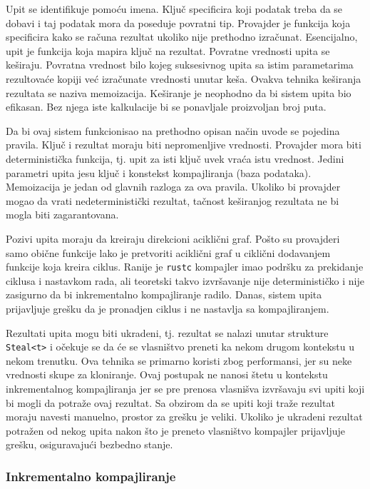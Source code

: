 Upit se identifikuje pomoću imena. Ključ specificira koji podatak treba da se dobavi i taj podatak 
mora da poseduje povratni tip. Provajder je funkcija koja specificira kako se računa rezultat ukoliko nije 
prethodno izračunat. Esencijalno, upit je funkcija koja mapira ključ na rezultat. 
Povratne vrednosti upita se keširaju. Povratna vrednost bilo kojeg suksesivnog upita sa istim parametarima rezultovaće 
kopiji već izračunate vrednosti unutar keša. Ovakva tehnika keširanja rezultata se naziva memoizacija.
Keširanje je neophodno da bi sistem upita bio efikasan. Bez njega iste kalkulacije bi se ponavljale proizvoljan broj puta.

Da bi ovaj sistem funkcionisao na prethodno opisan način uvode se pojedina pravila. Ključ i rezultat 
moraju biti nepromenljive vrednosti. Provajder mora biti deterministička funkcija, tj. upit za isti ključ
uvek vraća istu vrednost. Jedini parametri upita jesu ključ i konstekst kompajliranja (baza podataka).
Memoizacija je jedan od glavnih razloga za ova pravila. Ukoliko bi provajder mogao da vrati nedeterministički rezultat,
tačnost keširanjog rezultata ne bi mogla biti zagarantovana.

Pozivi upita moraju da kreiraju direkcioni aciklični graf. Pošto su provajderi samo obične funkcije lako je pretvoriti 
aciklični graf u ciklični dodavanjem funkcije koja kreira ciklus. Ranije je \verb|rustc| kompajler imao podršku 
za prekidanje ciklusa i nastavkom rada, ali teoretski takvo izvršavanje nije determinističko i nije zasigurno da bi 
inkrementalno kompajliranje radilo. Danas, sistem upita prijavljuje grešku da je pronadjen ciklus
i ne nastavlja sa kompajliranjem.

Rezultati upita mogu biti ukradeni, tj. rezultat se nalazi unutar strukture \verb|Steal<t>| i očekuje se da će se vlasništvo 
preneti ka nekom drugom kontekstu u nekom trenutku. Ova tehnika se primarno koristi zbog performansi, 
jer su neke vrednosti skupe za kloniranje. Ovaj postupak ne nanosi štetu u kontekstu inkrementalnog kompajliranja jer se pre 
prenosa vlasnišva izvršavaju svi upiti koji bi mogli da potraže ovaj rezultat. Sa obzirom da se upiti koji traže rezultat 
moraju navesti manuelno, prostor za grešku je veliki. Ukoliko je ukradeni rezultat potražen od nekog upita nakon što je preneto vlasništvo
kompajler prijavljuje grešku, osiguravajući bezbedno stanje.

\subsubsection{Inkrementalno kompajliranje}

